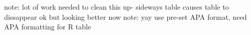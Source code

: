 \documentclass[]{article}
\begin{document}
\centering



note: lot of work needed to clean this up- sideways table causes table to dissappear ok but looking better now
note: yay use pre-set APA format, need APA formatting for R table
\end{document}
